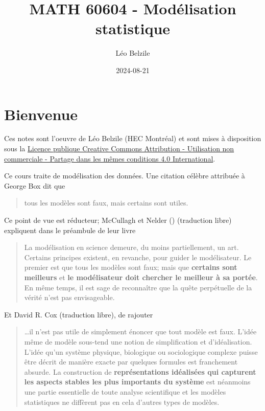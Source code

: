 \documentclass[
  11pt,
  letterpaper,
]{scrbook}
\title{MATH 60604 - Modélisation statistique}
\author{Léo Belzile}
\date{2024-08-21}
\renewcommand*\contentsname{Table des matières}
\newcommand\contentsname{Table des matières}
\theoremstyle{definition}
\theoremstyle{definition}
\theoremstyle{remark}
\begin{document}


\renewcommand*\contentsname{Table des matières}
{
\setcounter{tocdepth}{2}
\tableofcontents
}

\mainmatter
{}

\chapter*{Bienvenue}\label{bienvenue}


Ces notes sont l'oeuvre de Léo Belzile (HEC Montréal) et sont mises à
disposition sous la
\href{https://creativecommons.org/licenses/by-nc-sa/4.0/legalcode.fr}{Licence
publique Creative Commons Attribution - Utilisation non commerciale -
Partage dans les mêmes conditions 4.0 International}.

Ce cours traite de modélisation des données. Une citation célèbre
attribuée à George Box dit que

\begin{quote}
tous les modèles sont faux, mais certains sont utiles.
\end{quote}

Ce point de vue est réducteur; McCullagh et Nelder
() (traduction libre)
expliquent dans le préambule de leur livre

\begin{quote}
La modélisation en science demeure, du moins partiellement, un art.
Certains principes existent, en revanche, pour guider le modélisateur.
Le premier est que tous les modèles sont faux; mais que \textbf{certains
sont meilleurs} et \textbf{le modélisateur doit chercher le meilleur à
sa portée}. En même temps, il est sage de reconnaître que la quête
perpétuelle de la vérité n'est pas envisageable.
\end{quote}

Et David R. Cox (traduction libre), de rajouter

\begin{quote}
\ldots il n'est pas utile de simplement énoncer que tout modèle est
faux. L'idée même de modèle sous-tend une notion de simplification et
d'idéalisation. L'idée qu'un système physique, biologique ou
sociologique complexe puisse être décrit de manière exacte par quelques
formules est franchement absurde. La construction de
\textbf{représentations idéalisées qui capturent les aspects stables les
plus importants du système} est néanmoins une partie essentielle de
toute analyse scientifique et les modèles statistiques ne diffèrent pas
en cela d'autres types de modèles.
\end{quote}
\end{document}
